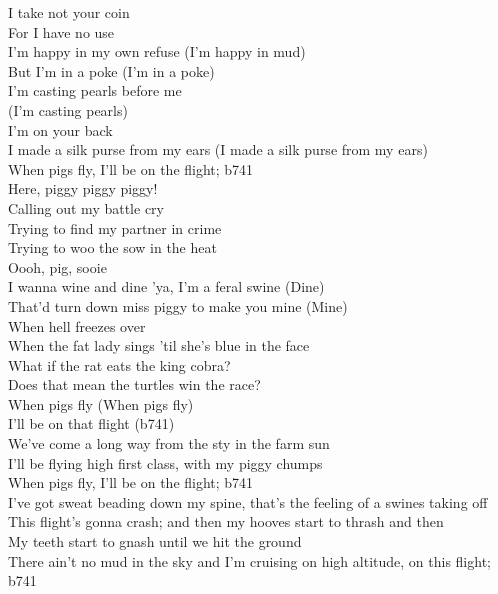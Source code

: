 I take not your coin\\
For I have no use\\
I'm happy in my own refuse (I'm happy in mud)\\

But I'm in a poke (I'm in a poke)\\
I'm casting pearls before me\\
(I'm casting pearls)\\
I'm on your back\\
I made a silk purse from my ears (I made a silk purse from my ears)\\

When pigs fly, I'll be on the flight; b741\\

Here, piggy piggy piggy!\\

Calling out my battle cry\\
Trying to find my partner in crime\\
Trying to woo the sow in the heat\\
Oooh, pig, sooie\\

I wanna wine and dine 'ya, I'm a feral swine (Dine)\\
That'd turn down miss piggy to make you mine (Mine)\\

When hell freezes over\\
When the fat lady sings 'til she's blue in the face\\
What if the rat eats the king cobra?\\
Does that mean the turtles win the race?\\

When pigs fly (When pigs fly)\\
I'll be on that flight (b741)\\

We've come a long way from the sty in the farm sun\\
I'll be flying high first class, with my piggy chumps\\

When pigs fly, I'll be on the flight; b741\\

I've got sweat beading down my spine, that's the feeling of a swines taking off\\
This flight's gonna crash; and then my hooves start to thrash and then\\
My teeth start to gnash until we hit the ground\\
There ain't no mud in the sky and I'm cruising on high altitude, on this flight; b741\\

